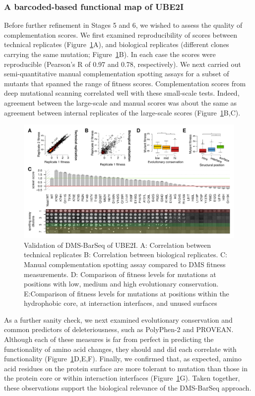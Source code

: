 \subsubsection{A barcoded-based functional map of UBE2I}

Before further refinement in Stages 5 and 6, we wished to assess the quality of complementation scores. We first examined reproducibility of scores between technical replicates (Figure~\ref{fig:barseqValidation}A), and biological replicates (different clones carrying the same mutation; Figure~\ref{fig:barseqValidation}B).  In each case the scores were reproducible (Pearson’s R of 0.97 and 0.78, respectively). We next carried out semi-quantitative manual complementation spotting assays for a subset of mutants that spanned the range of fitness scores. Complementation scores from deep mutational scanning correlated well with these small-scale tests. Indeed, agreement between the large-scale and manual scores was about the same as agreement between internal replicates of the large-scale scores (Figure~\ref{fig:barseqValidation}B,C). 

\begin{figure}[h!]
	\centering
	\includegraphics[width=\textwidth]{img/barseq-validation.pdf}
	\caption{Validation of DMS-BarSeq of UBE2I. A: Correlation between technical replicates B: Correlation between biological replicates. C: Manual complementation spotting assay compared to DMS fitness measurements. D: Comparison of fitness levels for mutations at positions with low, medium and high evolutionary conservation. E:Comparison of fitness levels for mutations at positions within the hydrophobic core, at interaction interfaces, and unused surfaces}
	\label{fig:barseqValidation}
\end{figure}

As a further sanity check, we next examined evolutionary conservation and common predictors of deleteriousness, such as PolyPhen-2\cite{polyphen} and PROVEAN\cite{provean}.  Although each of these measures is far from perfect in predicting the functionality of amino acid changes, they should and did each correlate with functionality (Figure~\ref{fig:barseqValidation}D,E,F). Finally, we confirmed that, as expected, amino acid residues on the protein surface are more tolerant to mutation than those in the protein core or within interaction interfaces (Figure~\ref{fig:barseqValidation}G).  Taken together, these observations support the biological relevance of the DMS-BarSeq approach.


